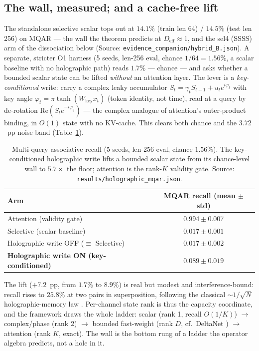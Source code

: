 \documentclass[11pt]{article}
\theoremstyle{definition}
\newcommand{\code}[1]{\texttt{#1}}
\begin{document}
\subsection{The wall, measured; and a cache-free lift}
The standalone selective scalar tops out at $14.1\%$ (train len 64) / $14.5\%$ (test len 256)
on MQAR --- the wall the theorem predicts at $D_\text{eff}{\approx}1$, and the sel4 (SSSS) arm
of the dissociation below (Source: \code{evidence\_companion/hybrid\_B.json}). A separate,
stricter O1 harness (5 seeds, len-256 eval, chance $1/64=1.56\%$, a scalar baseline with no
holographic path) reads $1.7\%$ --- chance --- and asks whether a bounded scalar state can be
lifted \emph{without} an attention layer. The lever is a \emph{key-conditioned} write: carry a
complex leaky accumulator $S_t=\gamma_t S_{t-1}+u_t e^{i\varphi_t}$ with key angle
$\varphi_t=\pi\tanh(W_\text{key}x_t)$ (token identity, not time), read at a query by de-rotation
$\mathrm{Re}(S_t e^{-i\varphi_q})$ --- the complex analogue of attention's outer-product binding,
in $O(1)$ state with no KV-cache. This clears both chance and the $3.72$~pp noise band
(Table~\ref{tab:recall}).

\begin{table}[t]
\centering
\caption{Multi-query associative recall (5 seeds, len-256 eval, chance $1.56\%$). The
key-conditioned holographic write lifts a bounded scalar state from its chance-level wall to
$5.7\times$ the floor; attention is the rank-$K$ validity gate. Source:
\code{results/holographic\_mqar.json}.}
\label{tab:recall}
\small
\begin{tabular}{@{}lc@{}}
\toprule
Arm & MQAR recall (mean $\pm$ std)\\
\midrule
Attention (validity gate) & $0.994 \pm 0.007$\\
Selective (scalar baseline) & $0.017 \pm 0.001$\\
Holographic write OFF ($\equiv$ Selective) & $0.017 \pm 0.002$\\
\textbf{Holographic write ON (key-conditioned)} & $\mathbf{0.089 \pm 0.019}$\\
\bottomrule
\end{tabular}
\end{table}

The lift ($+7.2$~pp, from $1.7\%$ to $8.9\%$) is real but modest and interference-bound: recall
rises to $25.8\%$ at two pairs in superposition, following the classical $\sim1/\sqrt{N}$
holographic-memory law \cite{plate1995holographic}. Per-channel state rank is thus the capacity
coordinate, and the framework draws the whole ladder: scalar (rank 1, recall $O(1/K)$) $\to$
complex/phase (rank 2) $\to$ bounded fast-weight (rank $D$, cf.\ DeltaNet \cite{yang2024deltanet})
$\to$ attention (rank $K$, exact). The wall is the bottom rung of a ladder the operator algebra
predicts, not a hole in it.
\end{document}
